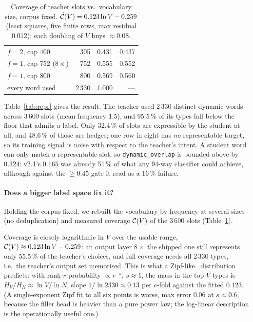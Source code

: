 \begin{table}[t]
\begin{minipage}[t]{0.46\textwidth}
\begin{tabular}{@{}lrrr@{}}
$f{=}2$, cap 400               &  305 & 0.431 & 0.437 \\
$f{=}1$, cap 752 ($8\times$)   &  752 & 0.555 & 0.552 \\
$f{=}1$, cap 800               &  800 & 0.569 & 0.560 \\
every word used                & 2\,330 & 1.000 & --- \\
\bottomrule
\end{tabular}
\caption{Coverage of teacher slots vs.\ vocabulary size, corpus fixed.
$\hat{\mathcal{C}}(V)=0.123\ln V-0.259$ (least squares, five finite rows, max residual
0.012); each doubling of $V$ buys $\approx0.08$.}
\label{tab:sweep}
\end{minipage}
\end{table}

Table~\ref{tab:repr} gives the result. The teacher used 2\,330 distinct
dynamic words across 3\,600 slots (mean frequency 1.5), and 95.5\,\% of its
types fall below the floor that admits a label. Only 32.4\,\% of slots are
expressible by the student at all, and 48.6\,\% of those are hedges; one row in
eight has \emph{no} representable target, so its training signal is noise with
respect to the teacher's intent. A student word can only match a representable
slot, so \texttt{dynamic\_overlap} is bounded above by $0.324$: v2.1's 0.165
was already 51\,\% of what any 94-way classifier could achieve, although
against the $\ge0.45$ gate it read as a 16\,\% failure.

\paragraph{Does a bigger label space fix it?} Holding the corpus fixed, we
rebuilt the vocabulary by frequency at several sizes (no deduplication) and
measured coverage $\mathcal{C}(V)$ of the 3\,600 slots (Table~\ref{tab:sweep}).


Coverage is closely logarithmic in $V$ over the usable range,
$\mathcal{C}(V)\approx0.123\ln V-0.259$: an output layer $8\times$ the shipped one
still represents only 55.5\,\% of the teacher's choices, and full coverage
needs all 2\,330 types, i.e.\ the teacher's output set memorised. This is what
a Zipf-like~\citep{zipf1949} distribution predicts: with rank-$r$ probability
$\propto r^{-s}$, $s\approx1$, the mass in the top $V$ types is
$H_V/H_N\approx\ln V/\ln N$, slope $1/\ln2330\approx0.13$ per $e$-fold against
the fitted $0.123$. (A single-exponent Zipf fit to all six points is worse,
max error 0.06 at $s\approx0.6$, because the filler head is heavier than a
pure power law; the log-linear description is the operationally useful one.)

